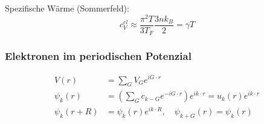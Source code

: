 Spezifische Wärme (Sommerfeld):
\begin{equation*}
    c_V^{el} \approx \frac{\pi^2 T}{3 T_F} \frac{3 nk_B}{2} = \gamma T
\end{equation*}

\subsubsection*{Elektronen im periodischen Potenzial}

\begin{equation*}
    \begin{aligned}
        V(r) &= \sum_G V_G e^{iG\cdot r} \\
        \psi_k(r) &= \left(\sum_G c_{k-G} e^{-iG \cdot r}\right) e^{ik \cdot r} = u_k(r) e^{ik \cdot r} \\
        \psi_k(r+R) &= \psi_k(r) e^{i k \cdot R}, \quad \psi_{k+G}(r) = \psi_k(r)
    \end{aligned}
\end{equation*}